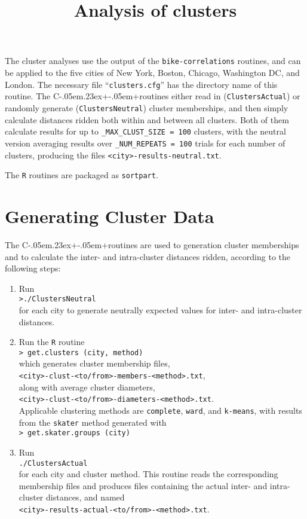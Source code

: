 \documentclass[a4paper,oneside]{article}
\title{Analysis of clusters}
\author{}
\date{}
\def\CPP{{C\kern-.05em\raise.23ex\hbox{+\kern-.05em+}\hspace{4pt}}}
\begin{document}
\maketitle

The cluster analyses use the output of the {\tt bike-correlations} routines, and can be applied to the five cities of New York, Boston, Chicago,
Washington DC, and London.  The necessary file ``{\tt clusters.cfg}'' has the directory name of this routine. The \CPP routines either read in
({\tt ClustersActual}) or randomly generate ({\tt ClustersNeutral}) cluster memberships, and then simply calculate distances ridden both within
and between all clusters. Both of them calculate results for up to {\tt \_MAX\_CLUST\_SIZE = 100} clusters, with the neutral version averaging
results over {\tt \_NUM\_REPEATS = 100} trials for each number of clusters, producing the files {\tt <city>-results-neutral.txt}.

The {\tt R} routines are packaged as {\tt sortpart}.

\section{Generating Cluster Data}

The \CPP routines are used to generation cluster memberships and to calculate the inter- and intra-cluster distances ridden, according to the
following steps:

\begin{enumerate}
    \item Run\\ {\tt >./ClustersNeutral}\\ for each city to generate neutrally expected values for inter- and intra-cluster distances.
    \item Run the {\tt R} routine\\ 
        {\tt > get.clusters (city, method)}\\
        which generates cluster membership files,\\ {\tt <city>-clust-<to/from>-members-<method>.txt},\\ along with average cluster diameters,\\
        {\tt <city>-clust-<to/from>-diameters-<method>.txt}.\\
        Applicable clustering methods are {\tt complete}, {\tt ward}, and {\tt k-means}, with results from the {\tt skater} method generated
        with\\
        {\tt > get.skater.groups (city)}
    \item Run\\
        {\tt ./ClustersActual}\\ for each city and cluster method. This routine reads the corresponding membership files and produces files
        containing the actual inter- and intra-cluster distances, and named\\ {\tt <city>-results-actual-<to/from>-<method>.txt}.
\end{enumerate}
\end{document}
